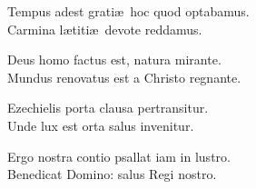 

\spazio

\strofa Tempus adest grati\ae\ hoc quod optabamus.\\
Carmina l\ae titi\ae\ devote reddamus.

\spazio


\spazio

\strofa Deus homo factus est, natura mirante.\\
Mundus renovatus est a Christo regnante.

\spazio


\spazio

\strofa Ezechielis porta clausa pertransitur.\\
Unde lux est orta salus invenitur.

\spazio


\spazio

\strofa Ergo nostra contio psallat iam in lustro.\\
Benedicat Domino: salus Regi nostro.

\spazio

